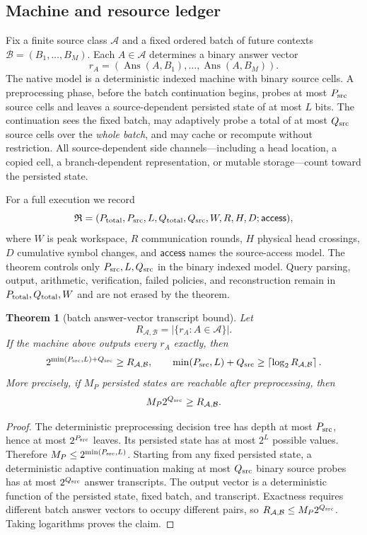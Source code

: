 \documentclass[11pt]{article}
\newtheorem{theorem}{Theorem}
\begin{document}
\subsection{Machine and resource ledger}

Fix a finite source class $\mathcal A$ and a fixed ordered batch of future contexts $\mathcal B=(B_1,\ldots,B_M)$.  Each $A\in\mathcal A$ determines a binary answer vector
\[
r_A=(\operatorname{Ans}(A,B_1),\ldots,\operatorname{Ans}(A,B_M)).
\]
The native model is a deterministic indexed machine with binary source cells.  A preprocessing phase, before the batch continuation begins, probes at most $P_{\rm src}$ source cells and leaves a source-dependent persisted state of at most $L$ bits.  The continuation sees the fixed batch, may adaptively probe a total of at most $Q_{\rm src}$ source cells over the \emph{whole batch}, and may cache or recompute without restriction.  All source-dependent side channels---including a head location, a copied cell, a branch-dependent representation, or mutable storage---count toward the persisted state.

For a full execution we record
\[
\mathfrak R=(P_{\rm total},P_{\rm src},L,Q_{\rm total},Q_{\rm src},W,R,H,D;\mathsf{access}),
\]
where $W$ is peak workspace, $R$ communication rounds, $H$ physical head crossings, $D$ cumulative symbol changes, and $\mathsf{access}$ names the source-access model.  The theorem controls only $P_{\rm src},L,Q_{\rm src}$ in the binary indexed model.  Query parsing, output, arithmetic, verification, failed policies, and reconstruction remain in $P_{\rm total},Q_{\rm total},W$ and are not erased by the theorem.

\begin{theorem}[batch answer-vector transcript bound]\label{thm:batch}
Let
\[
R_{\mathcal A,\mathcal B}=\bigl|\{r_A:A\in\mathcal A\}\bigr|.
\]
If the machine above outputs every $r_A$ exactly, then
\[
2^{\min(P_{\rm src},L)+Q_{\rm src}}\ge R_{\mathcal A,\mathcal B},
\qquad
\min(P_{\rm src},L)+Q_{\rm src}\ge
\left\lceil\log_2R_{\mathcal A,\mathcal B}\right\rceil.
\]
More precisely, if $M_P$ persisted states are reachable after preprocessing, then
\[
M_P2^{Q_{\rm src}}\ge R_{\mathcal A,\mathcal B}.
\]
\end{theorem}

\begin{proof}
The deterministic preprocessing decision tree has depth at most $P_{\rm src}$, hence at most $2^{P_{\rm src}}$ leaves.  Its persisted state has at most $2^L$ possible values.  Therefore $M_P\le 2^{\min(P_{\rm src},L)}$.  Starting from any fixed persisted state, a deterministic adaptive continuation making at most $Q_{\rm src}$ binary source probes has at most $2^{Q_{\rm src}}$ answer transcripts.  The output vector is a deterministic function of the persisted state, fixed batch, and transcript.  Exactness requires different batch answer vectors to occupy different pairs, so $R_{\mathcal A,\mathcal B}\le M_P2^{Q_{\rm src}}$.  Taking logarithms proves the claim.
\end{proof}
\end{document}
